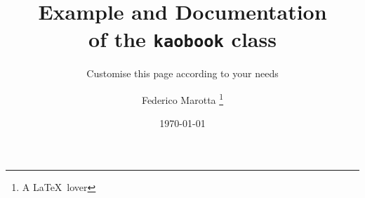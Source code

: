 \documentclass[
  fontsize=10pt,
  parskip=half,
  toc=listof,
  toc=index,
  toc=bibliography,
  twoside,
  open=right,
  headings=optiontoheadandtoc,
  numbers=noenddot,
]{../kaobook}
\begin{document}
%
%
%
%

\titlehead{The \texttt{kaobook} class}
\subject{Use this document as a template}
\title{Example and Documentation \\ of the \texttt{kaobook} class}
\subtitle{Customise this page according to your needs}
\author{Federico Marotta \thanks{A \LaTeX\ lover}}
\date{\today}
\publishers{an Awesome Publisher}

\frontmatter

%











%





\mainmatter



\end{document}
